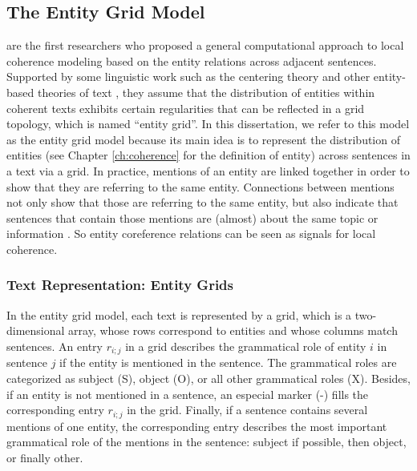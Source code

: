 \subsection{The Entity Grid Model}
\label{sec:rel-ent-grid} 

 are the first researchers who proposed a general computational approach to local coherence modeling based on the entity relations across adjacent sentences.  
Supported by some linguistic work such as the centering theory \cite{grosz95} and other entity-based theories of text \cite{prince81a}, they assume that the distribution of entities within coherent texts exhibits certain regularities that can be reflected in a grid topology, which is named  ``entity grid''.  
In this dissertation, we refer to this model as the entity grid model because its main idea is to represent the distribution of entities (see Chapter \ref{ch:coherence} for the definition of entity) across sentences in a text via a grid.   
In practice, mentions of an entity are linked together in order to show that they are referring to the same entity. 
Connections between mentions not only show that those are referring to the same entity, but also indicate that sentences that contain those mentions are (almost) about the same topic or information \cite{barzilay08}. 
So entity coreference relations can be seen as signals for local coherence. 

\subsubsection{Text Representation: Entity Grids}

In the entity grid model, each text is represented by a grid, which is a two-dimensional array, whose rows correspond to entities and whose columns match sentences.
An entry $r_{i;j}$ in a grid describes the grammatical role of entity $i$ in sentence $j$ if the entity is mentioned in the sentence. 
The grammatical roles are categorized as subject (S), object (O), or all other grammatical roles (X). 
Besides, if an entity is not mentioned in a sentence, an especial marker (-) fills the corresponding entry $r_{i;j}$ in the grid. 
Finally, if a sentence contains several mentions of one entity, the corresponding entry describes the most important grammatical role of the mentions in the sentence: subject if possible, then object, or finally other. 

